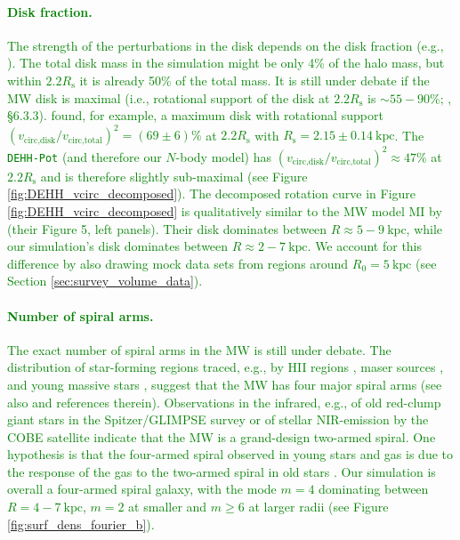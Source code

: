 \documentclass[iop,revtex4,numberedappendix,appendixfloats]{emulateapj}
\newcommand{\NEW}[1]{\textcolor{Green}{#1}}
\begin{document}
\NEW{\paragraph{Disk fraction.} The strength of the perturbations in the disk depends on the disk fraction (e.g., \citealt{2015ApJ...808L...8D}). The total disk mass in the simulation might be only 4\% of the halo mass, but within $2.2R_\text{s}$ it is already 50\% of the total mass. It is still under debate if the MW disk is maximal (i.e., rotational support of the disk at $2.2R_\text{s}$ is $\sim55-90\%$; \citealt{1997ApJ...483..103S, 2008gady.book.....B}, \S 6.3.3). \citet{2013ApJ...779..115B} found, for example, a maximum disk with rotational support $\left( v_\text{circ,disk}/v_\text{circ,total}\right)^2=(69\pm6)\%$ at $2.2R_\text{s}$ with $R_\text{s}=2.15\pm0.14~\text{kpc}$. The \texttt{DEHH-Pot} (and therefore our $N$-body model) has  $\left( v_\text{circ,disk}/v_\text{circ,total}\right)^2\approx47\%$ at $2.2R_\text{s}$ and is therefore slightly sub-maximal (see Figure \ref{fig:DEHH_vcirc_decomposed}). The decomposed rotation curve in Figure \ref{fig:DEHH_vcirc_decomposed} is qualitatively similar to the MW model MI by \citet{2016A&A...593A.108B} (their Figure 5, left panels). Their disk dominates between $R\approx5-9~\text{kpc}$, while our simulation's disk dominates between $R\approx2-7~\text{kpc}$. We account for this difference by also drawing mock data sets from regions around $R_0=5~\text{kpc}$ (see Section \ref{sec:survey_volume_data}).}

\NEW{\paragraph{Number of spiral arms.}  The exact number of spiral arms in the MW is still under debate. The distribution of star-forming regions traced, e.g., by HII regions \citep{1976A&A....49...57G}, maser sources \citep{2009ApJ...700..137R,2014ApJ...783..130R}, and young massive stars \citep{2014MNRAS.437.1791U}, suggest that the MW has four major spiral arms (see also \citet{2008AJ....135.1301V,2014AJ....148....5V} and references therein). Observations in the infrared, e.g., of old red-clump giant stars  in the Spitzer/GLIMPSE survey \citep{2009PASP..121..213C} or of stellar NIR-emission by the COBE satellite \citep{2001ApJ...556..181D} indicate that the MW is a grand-design two-armed spiral. One hypothesis is that the four-armed spiral observed in young stars and gas is due to the response of the gas to the two-armed spiral in old stars \citep{2000A&A...358L..13D,2004MNRAS.350L..47M}. Our simulation is overall a four-armed spiral galaxy, with the mode $m=4$ dominating between $R=4-7~\text{kpc}$, $m=2$ at smaller and $m\geq6$ at larger radii (see Figure \ref{fig:surf_dens_fourier_b}).} 
\end{document}
